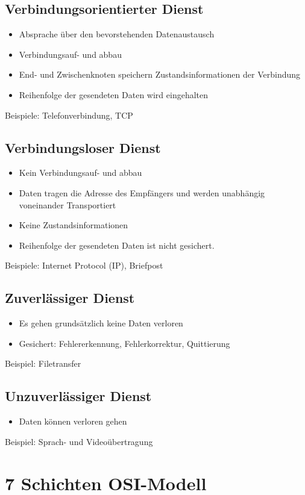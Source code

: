 
\subsection*{Verbindungsorientierter Dienst}
\begin{itemize}
\item Absprache über den bevorstehenden Datenaustausch
\item Verbindungsauf- und abbau
\item End- und Zwischenknoten speichern Zustandsinformationen der Verbindung
\item Reihenfolge der gesendeten Daten wird eingehalten
\end{itemize}
Beispiele: Telefonverbindung, TCP


\subsection*{Verbindungsloser Dienst}
\begin{itemize}
\item Kein Verbindungsauf- und abbau
\item Daten tragen die Adresse des Empfängers und werden unabhängig voneinander
Transportiert
\item Keine Zustandsinformationen
\item Reihenfolge der gesendeten Daten ist nicht gesichert.
\end{itemize}
Beispiele: Internet Protocol (IP), Briefpost


\subsection*{Zuverlässiger Dienst}
\begin{itemize}
\item Es gehen grundsätzlich keine Daten verloren
\item Gesichert: Fehlererkennung, Fehlerkorrektur, Quittierung
\end{itemize}
Beispiel: Filetransfer


\subsection*{Unzuverlässiger Dienst}
\begin{itemize}
\item Daten können verloren gehen
\end{itemize}
Beispiel: Sprach- und Videoübertragung


\section*{7 Schichten OSI-Modell}

